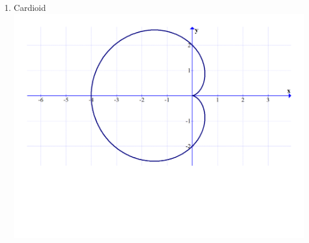 \documentclass[12pt]{article}
\newif\ifans
\begin{document}
\begin{enumerate}
\item Cardioid\\
\includegraphics[scale=0.35]{graph3.pdf}

\ifans{\fbox{$r=2(1-\cos{\theta})$}} \fi

\end{enumerate}

\newpage

\end{document}
